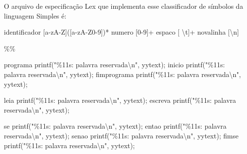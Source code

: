 \documentclass[
  brazilian,
  letterpaper,
]{book}
\newenvironment{Shaded}{\begin{snugshade}}{\end{snugshade}}
\newcommand{\DecValTok}[1]{\textcolor[rgb]{0.68,0.00,0.00}{#1}}
\newcommand{\NormalTok}[1]{\textcolor[rgb]{0.00,0.23,0.31}{#1}}
\newcommand{\OperatorTok}[1]{\textcolor[rgb]{0.37,0.37,0.37}{#1}}
\newcommand{\SpecialCharTok}[1]{\textcolor[rgb]{0.37,0.37,0.37}{#1}}
\newcommand{\StringTok}[1]{\textcolor[rgb]{0.13,0.47,0.30}{#1}}
\theoremstyle{plain}
\theoremstyle{definition}
\theoremstyle{remark}
\begin{document}
O arquivo de especificação Lex que implementa esse classificador de
símbolos da linguagem Simples é:

\begin{Shaded}
\begin{Highlighting}[]
\NormalTok{identificador  }\OperatorTok{[}\NormalTok{a}\OperatorTok{{-}}\NormalTok{zA}\OperatorTok{{-}}\NormalTok{Z}\OperatorTok{]([}\NormalTok{a}\OperatorTok{{-}}\NormalTok{zA}\OperatorTok{{-}}\NormalTok{Z0}\OperatorTok{{-}}\DecValTok{9}\OperatorTok{])*}
\NormalTok{numero         }\OperatorTok{[}\DecValTok{0}\OperatorTok{{-}}\DecValTok{9}\OperatorTok{]+}
\NormalTok{espaco         }\OperatorTok{[}\NormalTok{ \textbackslash{}t}\OperatorTok{]+}
\NormalTok{novalinha      }\OperatorTok{[}\NormalTok{\textbackslash{}n}\OperatorTok{]}

\OperatorTok{\%\%}

\NormalTok{programa    printf}\OperatorTok{(}\StringTok{"}\SpecialCharTok{\%11s}\StringTok{: palavra reservada}\SpecialCharTok{\textbackslash{}n}\StringTok{"}\OperatorTok{,}\NormalTok{ yytext}\OperatorTok{);}
\NormalTok{inicio      printf}\OperatorTok{(}\StringTok{"}\SpecialCharTok{\%11s}\StringTok{: palavra reservada}\SpecialCharTok{\textbackslash{}n}\StringTok{"}\OperatorTok{,}\NormalTok{ yytext}\OperatorTok{);}
\NormalTok{fimprograma printf}\OperatorTok{(}\StringTok{"}\SpecialCharTok{\%11s}\StringTok{: palavra reservada}\SpecialCharTok{\textbackslash{}n}\StringTok{"}\OperatorTok{,}\NormalTok{ yytext}\OperatorTok{);}

\NormalTok{leia        printf}\OperatorTok{(}\StringTok{"}\SpecialCharTok{\%11s}\StringTok{: palavra reservada}\SpecialCharTok{\textbackslash{}n}\StringTok{"}\OperatorTok{,}\NormalTok{ yytext}\OperatorTok{);}
\NormalTok{escreva     printf}\OperatorTok{(}\StringTok{"}\SpecialCharTok{\%11s}\StringTok{: palavra reservada}\SpecialCharTok{\textbackslash{}n}\StringTok{"}\OperatorTok{,}\NormalTok{ yytext}\OperatorTok{);}

\NormalTok{se      printf}\OperatorTok{(}\StringTok{"}\SpecialCharTok{\%11s}\StringTok{: palavra reservada}\SpecialCharTok{\textbackslash{}n}\StringTok{"}\OperatorTok{,}\NormalTok{ yytext}\OperatorTok{);}
\NormalTok{entao       printf}\OperatorTok{(}\StringTok{"}\SpecialCharTok{\%11s}\StringTok{: palavra reservada}\SpecialCharTok{\textbackslash{}n}\StringTok{"}\OperatorTok{,}\NormalTok{ yytext}\OperatorTok{);}
\NormalTok{senao       printf}\OperatorTok{(}\StringTok{"}\SpecialCharTok{\%11s}\StringTok{: palavra reservada}\SpecialCharTok{\textbackslash{}n}\StringTok{"}\OperatorTok{,}\NormalTok{ yytext}\OperatorTok{);}
\NormalTok{fimse       printf}\OperatorTok{(}\StringTok{"}\SpecialCharTok{\%11s}\StringTok{: palavra reservada}\SpecialCharTok{\textbackslash{}n}\StringTok{"}\OperatorTok{,}\NormalTok{ yytext}\OperatorTok{);}


\end{Highlighting}
\end{Shaded}
\end{document}
